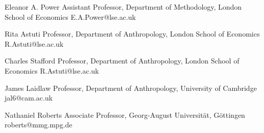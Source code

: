 

\begin{cvreferences}

  \cvreference
    {Eleanor A. Power} %
    {Assistant Professor, Department of Methodology, London School of Economics} %
    {E.A.Power@lse.ac.uk}

  \cvreference
    {Rita Astuti} %
    {Professor, Department of Anthropology, London School of Economics} %
    {R.Astuti@lse.ac.uk}



  \cvreference
    {Charles Stafford} %
    {Professor, Department of Anthropology, London School of Economics} %
    {R.Astuti@lse.ac.uk}


\end{cvreferences}


\begin{cvreferences}

  \cvreference
    {James Laidlaw} %
    {Professor, Department of Anthropology, University of Cambridge} %
    {jal6@cam.ac.uk}

  \cvreference
    {Nathaniel Roberts} %
    {Associate Professor, Georg-August Universität, Göttingen} %
    {roberts@mmg.mpg.de}

\end{cvreferences}
